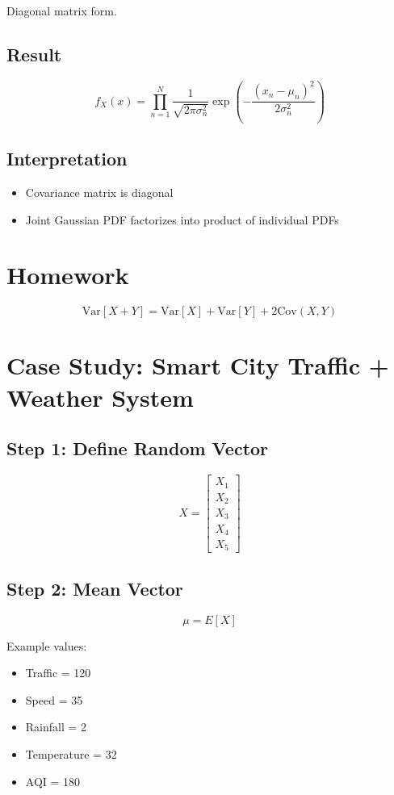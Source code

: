 \documentclass[12pt]{article}
\begin{document}
Diagonal matrix form.

\subsection{Result}

\[
f_X(x) = \prod_{n=1}^{N}
\frac{1}{\sqrt{2\pi\sigma_n^2}}
\exp\left(-\frac{(x_n-\mu_n)^2}{2\sigma_n^2}\right)
\]

\subsection{Interpretation}

\begin{itemize}
\item Covariance matrix is diagonal
\item Joint Gaussian PDF factorizes into product of individual PDFs
\end{itemize}

\section{Homework}

\[
\text{Var}[X+Y] = \text{Var}[X] + \text{Var}[Y] + 2\text{Cov}(X,Y)
\]

\section{Case Study: Smart City Traffic + Weather System}

\subsection{Step 1: Define Random Vector}

\[
X =
\begin{bmatrix}
X_1 \\
X_2 \\
X_3 \\
X_4 \\
X_5
\end{bmatrix}
\]

\subsection{Step 2: Mean Vector}

\[
\mu = E[X]
\]

Example values:
\begin{itemize}
\item Traffic = 120
\item Speed = 35
\item Rainfall = 2
\item Temperature = 32
\item AQI = 180
\end{itemize}
\end{document}

